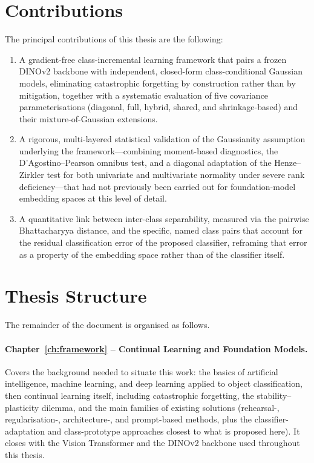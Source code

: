 \section{Contributions}

The principal contributions of this thesis are the following:
\begin{enumerate}
	\item A gradient-free class-incremental learning framework that pairs a frozen DINOv2 backbone with independent, closed-form class-conditional Gaussian models, eliminating catastrophic forgetting by construction rather than by mitigation, together with a systematic evaluation of five covariance parameterisations (diagonal, full, hybrid, shared, and shrinkage-based) and their mixture-of-Gaussian extensions.
	\item A rigorous, multi-layered statistical validation of the Gaussianity assumption underlying the framework---combining moment-based diagnostics, the D'Agostino--Pearson omnibus test, and a diagonal adaptation of the Henze--Zirkler test for both univariate and multivariate normality under severe rank deficiency---that had not previously been carried out for foundation-model embedding spaces at this level of detail.
	\item A quantitative link between inter-class separability, measured via the pairwise Bhattacharyya distance, and the specific, named class pairs that account for the residual classification error of the proposed classifier, reframing that error as a property of the embedding space rather than of the classifier itself.
\end{enumerate}

\section{Thesis Structure}

The remainder of the document is organised as follows.

\paragraph{Chapter~\ref{ch:framework} -- Continual Learning and Foundation Models.} Covers the background needed to situate this work: the basics of artificial intelligence, machine learning, and deep learning applied to object classification, then continual learning itself, including catastrophic forgetting, the stability--plasticity dilemma, and the main families of existing solutions (rehearsal-, regularisation-, architecture-, and prompt-based methods, plus the classifier-adaptation and class-prototype approaches closest to what is proposed here). It closes with the Vision Transformer and the DINOv2 backbone used throughout this thesis.

